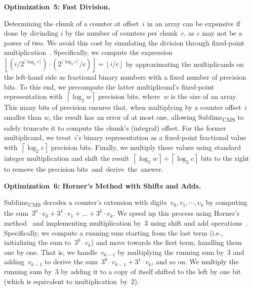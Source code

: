 \documentclass[sigconf]{acmart}
\newcommand{\sketch}{Sublime}
\newcommand{\sketchcms}{\sketch\textsubscript{CMS}\xspace}
\begin{document}
\hypertarget{optimization:fast_division}{\textbf{Optimization~5: Fast Division.}}
Determining the chunk of a counter at offset~$i$ in an array can be expensive
if done by divinding $i$ by the number of counters per chunk~$c$, as $c$ may
not be a power of two. We avoid this cost by simulating the division through
fixed-point multiplication~\cite{HackersDelight}. Specifically, we compute the
expression~$\left\lfloor \left(i/2^{\lceil \log_2 c \rceil}\right) \cdot
\left(2^{\lceil \log_2 c \rceil}/c\right) \right\rfloor = \left\lfloor i/c
\right\rfloor$ by approximating the multiplicands on the left-hand side as
fractional binary numbers with a fixed number of precision bits. To this end,
we precompute the latter multiplicand's fixed-point representation
with~$\left\lceil \log_2 w \right\rceil$ precision bits, where~$w$ is the size
of an array. This many bits of precision ensures that, when multiplying by a
counter offset~$i$ smaller than $w$, the result has an error of at most one,
allowing \sketchcms to safely truncate it to compute the chunk's (integral)
offset. For the former multiplicand, we treat~$i$'s binary representation as a
fixed-point fractional value with~$\left\lceil \log_2 c \right\rceil$ precision
bits. Finally, we multiply these values using standard integer multiplication
and shift the result~$\left\lceil \log_2 w \right\rceil + \left\lceil \log_2 c
\right\rceil$ bits to the right to remove the precision
bits~and~derive~the~answer. 

\hypertarget{optimization:horner_hack}{\textbf{Optimization~6: Horner's Method with Shifts and Adds.}}
\sketchcms decodes a counter's extension with
digits~$v_0, v_1, \cdots, v_k$ by computing the sum~$3^0 \cdot v_0 + 3^1 \cdot
v_1 + \dots + 3^k \cdot v_k$. We speed up this process using Horner's
method~\cite{Horner,HornerKnuth} and implementing multiplication by~3 using
shift and add operations~\cite{HackersDelight}. Specifically, we compute a
running sum starting from the last term (i.e., initializing the sum to~$3^0
\cdot v_k$) and move towards the first term, handling them one by one. That is,
we handle~$v_{k-1}$ by multiplying the running sum by~3 and adding~$v_{k-1}$ to
derive the sum~$3^0 \cdot v_{k-1} + 3^1 \cdot v_k$, and so on. We multiply the
running sum by~3 by adding it to a copy of itself shifted to the left by one
bit (which is equivalent to multiplication~by~2).
\end{document}
